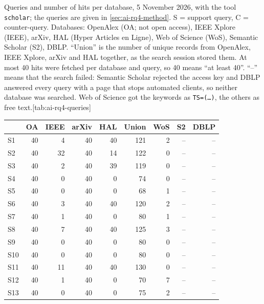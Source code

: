 \begin{table}[htbp]
  \begin{sidecaption}{Queries and number of hits per database, 5 November
    2026, with the tool \texttt{scholar}; the queries are given in
    \cref{sec:ai-rq4-method}.
    S = support query, C = counter-query.
    Databases: OpenAlex (OA; not open access), IEEE Xplore (IEEE), arXiv, HAL
    (Hyper Articles en Ligne), Web of Science (WoS), Semantic Scholar (S2),
    DBLP.
    \enquote{Union} is the number of unique records from OpenAlex, IEEE Xplore,
    arXiv and HAL together, as the search session stored them.
    At most 40 hits were fetched per database and query, so 40 means
    \enquote{at least 40}.
    \enquote{--} means that the search failed: Semantic Scholar rejected the
    access key and DBLP answered every query with a page that stops automated
    clients, so neither database was searched.
    Web of Science got the keywords as \texttt{TS=(\dots)}, the others as free
    text.}[tab:ai-rq4-queries] \centering\footnotesize
    \begin{tabular}{@{}lrrrrrrrr@{}}
      \toprule
          & OA & IEEE & arXiv & HAL & Union & WoS & S2 & DBLP \\
      \midrule
      S1  & 40 & 4    & 40    & 40  & 121   & 2   & -- & --   \\
      S2  & 40 & 32   & 40    & 14  & 122   & 0   & -- & --   \\
      S3  & 40 & 2    & 40    & 39  & 119   & 0   & -- & --   \\
      S4  & 40 & 0    & 40    & 0   & 74    & 0   & -- & --   \\
      S5  & 40 & 0    & 40    & 0   & 68    & 1   & -- & --   \\
      S6  & 40 & 3    & 40    & 40  & 120   & 2   & -- & --   \\
      S7  & 40 & 1    & 40    & 0   & 80    & 1   & -- & --   \\
      S8  & 40 & 7    & 40    & 40  & 125   & 3   & -- & --   \\
      S9  & 40 & 0    & 40    & 0   & 80    & 0   & -- & --   \\
      S10 & 40 & 0    & 40    & 0   & 80    & 0   & -- & --   \\
      S11 & 40 & 11   & 40    & 40  & 130   & 0   & -- & --   \\
      S12 & 40 & 1    & 40    & 0   & 70    & 7   & -- & --   \\
      S13 & 40 & 0    & 40    & 0   & 75    & 2   & -- & --   \\

\end{tabular}
\end{sidecaption}
\end{table}

